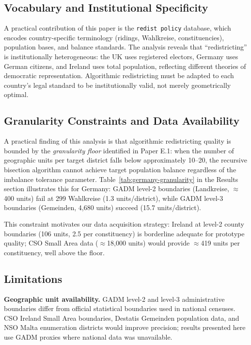 \subsection{Vocabulary and Institutional Specificity}

A practical contribution of this paper is the \texttt{redist policy} database, which encodes country-specific terminology (ridings, Wahlkreise, constituencies), population bases, and balance standards. The analysis reveals that ``redistricting'' is institutionally heterogeneous: the UK uses registered electors, Germany uses German citizens, and Ireland uses total population, reflecting different theories of democratic representation. Algorithmic redistricting must be adapted to each country's legal standard to be institutionally valid, not merely geometrically optimal.

\subsection{Granularity Constraints and Data Availability}

A practical finding of this analysis is that algorithmic redistricting quality is bounded by the \emph{granularity floor} identified in Paper E.1: when the number of geographic units per target district falls below approximately 10--20, the recursive bisection algorithm cannot achieve target population balance regardless of the imbalance tolerance parameter. Table~\ref{tab:germany-granularity} in the Results section illustrates this for Germany: GADM level-2 boundaries (Landkreise, $\approx$400 units) fail at 299 Wahlkreise (1.3 units/district), while GADM level-3 boundaries (Gemeinden, 4{,}680 units) succeed (15.7 units/district).

This constraint motivates our data acquisition strategy: Ireland at level-2 county boundaries (106 units, 2.5 per constituency) is borderline adequate for prototype quality; CSO Small Area data ($\approx$18{,}000 units) would provide $\approx$419 units per constituency, well above the floor.

\subsection{Limitations}

\textbf{Geographic unit availability.} GADM level-2 and level-3 administrative boundaries differ from official statistical boundaries used in national censuses. CSO Ireland Small Area boundaries, Destatis Gemeinden population data, and NSO Malta enumeration districts would improve precision; results presented here use GADM proxies where national data was unavailable.

